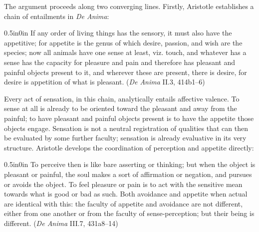 \documentclass{article}
\begin{document}
The argument proceeds along two converging lines. Firstly, Aristotle establishes a chain of entailments in \textit{De Anima}:
\begin{adjustwidth}{0.5in}{0in}
If any order of living things has the sensory, it must also have the appetitive; for appetite is the genus of which desire, passion, and wish are the species; now all animals have one sense at least, viz. touch, and whatever has a sense has the capacity for pleasure and pain and therefore has pleasant and painful objects present to it, and wherever these are present, there is desire, for desire is appetition of what is pleasant. (\textit{De Anima} II.3, 414b1--6)
\end{adjustwidth}
Every act of sensation, in this chain, analytically entails affective valence. To sense at all is already to be oriented toward the pleasant and away from the painful; to have pleasant and painful objects present is to have the appetite those objects engage. Sensation is not a neutral registration of qualities that can then be evaluated by some further faculty; sensation is already evaluative in its very structure. Aristotle develops the coordination of perception and appetite directly:
\begin{adjustwidth}{0.5in}{0in}
To perceive then is like bare asserting or thinking; but when the object is pleasant or painful, the soul makes a sort of affirmation or negation, and pursues or avoids the object. To feel pleasure or pain is to act with the sensitive mean towards what is good or bad as such. Both avoidance and appetite when actual are identical with this: the faculty of appetite and avoidance are not different, either from one another or from the faculty of sense-perception; but their being is different. (\textit{De Anima} III.7, 431a8--14)
\end{adjustwidth}
\end{document}
